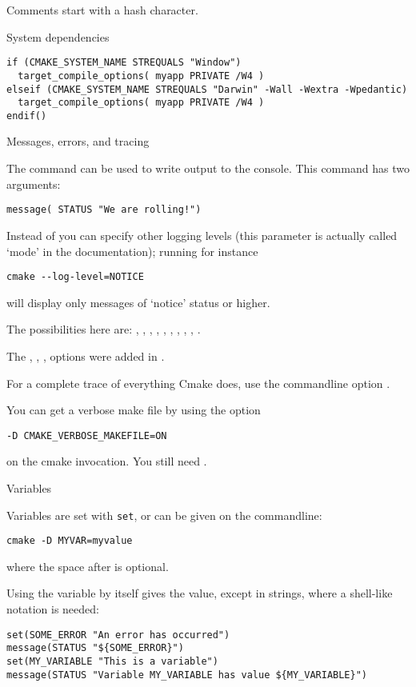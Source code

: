 Comments start with a hash character.

 {System dependencies}

\begin{lstlisting}
if (CMAKE_SYSTEM_NAME STREQUALS "Window")
  target_compile_options( myapp PRIVATE /W4 )
elseif (CMAKE_SYSTEM_NAME STREQUALS "Darwin" -Wall -Wextra -Wpedantic)
  target_compile_options( myapp PRIVATE /W4 )
endif()
\end{lstlisting}

 {Messages, errors, and tracing}

The  command can be used to write output
to the console. This command has two arguments:
\begin{lstlisting}
message( STATUS "We are rolling!")
\end{lstlisting}
Instead of  you can specify other logging levels
(this parameter is actually called `mode' in the documentation);
running for instance
\begin{verbatim}
cmake --log-level=NOTICE
\end{verbatim}
will display only messages of `notice' status or higher.

The possibilities here are: , ,
, , , ,
, , , .

The , , ,  options
were added in .

For a complete trace of everything Cmake does, use
the commandline option .

You can get a verbose make file by using the option
\begin{verbatim}
-D CMAKE_VERBOSE_MAKEFILE=ON
\end{verbatim}
on the cmake invocation. You still need .

 {Variables}

Variables are set with \texttt{set},
or can be given on the commandline:
\begin{lstlisting}
cmake -D MYVAR=myvalue
\end{lstlisting}
where the space after  is optional.

Using the variable by itself gives the value,
except in strings, where a shell-like notation is needed:
\begin{lstlisting}
set(SOME_ERROR "An error has occurred")
message(STATUS "${SOME_ERROR}")
set(MY_VARIABLE "This is a variable")
message(STATUS "Variable MY_VARIABLE has value ${MY_VARIABLE}")
\end{lstlisting}


